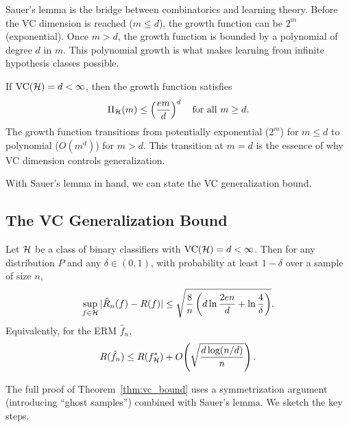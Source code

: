 \documentclass[11pt,a4paper]{article}
\begin{document}
\begin{remark}
\label{rem:sauer_significance}
Sauer's lemma is the bridge between combinatorics and learning theory.
Before the VC dimension is reached ($m \leq d$), the growth function
can be $2^m$ (exponential).  Once $m > d$, the growth function is
bounded by a polynomial of degree $d$ in $m$.  This polynomial growth
is what makes learning from infinite hypothesis classes possible.
\end{remark}

\begin{keyresult}[title={Sauer's Lemma and Polynomial Growth}]
If $\operatorname{VC}(\mathcal{H}) = d < \infty$, then the growth function satisfies
\[
    \Pi_{\mathcal{H}}(m) \leq \left(\frac{em}{d}\right)^d
    \quad \text{for all } m \geq d.
\]
The growth function transitions from potentially exponential ($2^m$)
for $m \leq d$ to polynomial ($O(m^d)$) for $m > d$.  This transition
at $m = d$ is the essence of why VC dimension controls generalization.
\end{keyresult}

With Sauer's lemma in hand, we can state the VC generalization bound.

\subsection{The VC Generalization Bound}

\begin{theorem}[VC Bound]
\label{thm:vc_bound}
Let $\mathcal{H}$ be a class of binary classifiers with
$\operatorname{VC}(\mathcal{H}) = d < \infty$.  Then for any distribution $P$ and any
$\delta \in (0, 1)$, with probability at least $1 - \delta$ over a
sample of size $n$,
\[
    \sup_{f \in \mathcal{H}} |\hat{R}_n(f) - R(f)|
    \leq \sqrt{\frac{8}{n}\left(d \ln\frac{2en}{d}
    + \ln\frac{4}{\delta}\right)}.
\]
Equivalently, for the ERM $\hat{f}_n$,
\[
    R(\hat{f}_n) \leq R(f_{\mathcal{H}}^*)
    + O\!\left(\sqrt{\frac{d \log(n/d)}{n}}\right).
\]
\end{theorem}

The full proof of Theorem~\ref{thm:vc_bound} uses a symmetrization
argument (introducing ``ghost samples'') combined with Sauer's lemma.
We sketch the key steps.
\end{document}
